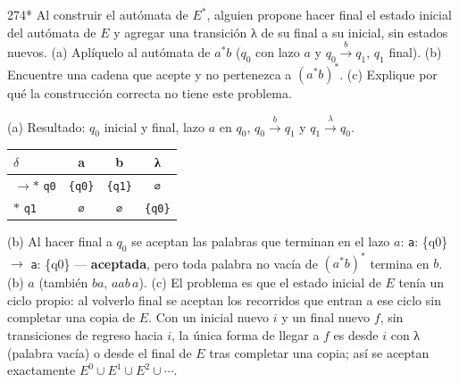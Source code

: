 \documentclass[11pt]{article}
\begin{document}
\begin{ejercicio}{274}{*}
Al construir el autómata de $E^*$, alguien propone hacer final el estado inicial del autómata de $E$ y agregar una transición λ de su final a su inicial, sin estados nuevos. (a) Aplíquelo al autómata de $a^*b$ ($q_0$ con lazo $a$ y $q_0 \xrightarrow{b} q_1$, $q_1$ final). (b) Encuentre una cadena que acepte y no pertenezca a $(a^*b)^*$. (c) Explique por qué la construcción correcta no tiene este problema.
\end{ejercicio}
\proc (a) Resultado: $q_0$ inicial y final, lazo $a$ en $q_0$, $q_0 \xrightarrow{b} q_1$ y $q_1 \xrightarrow{\lambda} q_0$.\begin{center}\small\begin{tabular}{lccc}\toprule
$\delta$ & a & b & λ \\\midrule
$\to$$*$ \texttt{q0} & \texttt{\{q0\}} & \texttt{\{q1\}} & \texttt{∅} \\
$*$ \texttt{q1} & \texttt{∅} & \texttt{∅} & \texttt{\{q0\}} \\
\bottomrule\end{tabular}\end{center}
(b) Al hacer final a $q_0$ se aceptan las palabras que terminan en el lazo $a$: \texttt{a}: \{q0\} $\to$ \texttt{a}: \{q0\} — \textbf{aceptada}, pero toda palabra no vacía de $(a^*b)^*$ termina en $b$.
\resp (b) $a$ (también $ba$, $aab\,a$). (c) El problema es que el estado inicial de $E$ tenía un ciclo propio: al volverlo final se aceptan los recorridos que entran a ese ciclo sin completar una copia de $E$. Con un inicial nuevo $i$ y un final nuevo $f$, sin transiciones de regreso hacia $i$, la única forma de llegar a $f$ es desde $i$ con λ (palabra vacía) o desde el final de $E$ tras completar una copia; así se aceptan exactamente $E^0 \cup E^1 \cup E^2 \cup \cdots$.
\end{document}
